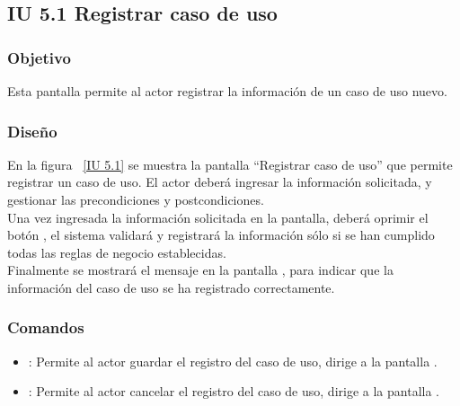 \subsection{IU 5.1 Registrar caso de uso}

\subsubsection{Objetivo}
	
	Esta pantalla permite al actor registrar la información de un caso de uso nuevo.

\subsubsection{Diseño}

    En la figura ~\ref{IU 5.1} se muestra la pantalla ``Registrar caso de uso'' que permite registrar un caso de uso. El actor deberá ingresar la información solicitada, 
    y gestionar las precondiciones y postcondiciones.\\
    
    
    Una vez ingresada la información solicitada en la pantalla, deberá oprimir el botón 
    , el sistema validará y registrará la información sólo si se han cumplido todas las reglas de negocio establecidas.  \\
    
    Finalmente se mostrará el mensaje  en la pantalla , para indicar que la información del caso de uso
    se ha registrado correctamente.        


    


\subsubsection{Comandos}
\begin{itemize}
	\item {}: Permite al actor guardar el registro del caso de uso, dirige a la pantalla .
	\item {}: Permite al actor cancelar el registro del caso de uso, dirige a la pantalla .
\end{itemize}

